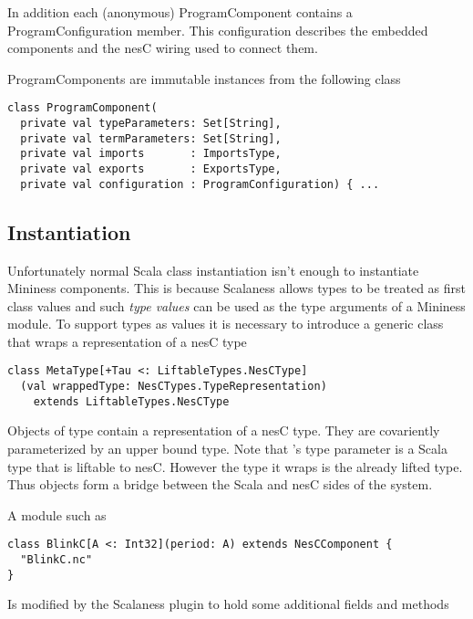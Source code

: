 In addition each (anonymous) ProgramComponent contains a ProgramConfiguration member. This
configuration describes the embedded components and the nesC wiring used to connect them.

ProgramComponents are immutable instances from the following class

\singlespace
\begin{lstlisting}[language=scalaness]
class ProgramComponent(
  private val typeParameters: Set[String],
  private val termParameters: Set[String],
  private val imports       : ImportsType,
  private val exports       : ExportsType,
  private val configuration : ProgramConfiguration) { ...
\end{lstlisting}
\primaryspacing

\subsection{Instantiation}

Unfortunately normal Scala class instantiation isn't enough to instantiate Mininess components.
This is because Scalaness allows types to be treated as first class values and such \textit{type
  values} can be used as the type arguments of a Mininess module. To support types as values it
is necessary to introduce a generic class that wraps a representation of a nesC type

\singlespace
\begin{lstlisting}[language=scalaness]
class MetaType[+Tau <: LiftableTypes.NesCType]
  (val wrappedType: NesCTypes.TypeRepresentation)
    extends LiftableTypes.NesCType
\end{lstlisting}
\primaryspacing

Objects of type  contain a representation of a nesC type. They are
covariently parameterized by an upper bound type. Note that 's type
parameter is a Scala type that is liftable to nesC. However the type it wraps is the already
lifted type. Thus  objects form a bridge between the Scala and nesC sides
of the system.

A module such as

\singlespace
\begin{lstlisting}[language=scalaness]
class BlinkC[A <: Int32](period: A) extends NesCComponent {
  "BlinkC.nc"
}
\end{lstlisting}
\primaryspacing

Is modified by the Scalaness plugin to hold some additional fields and methods

